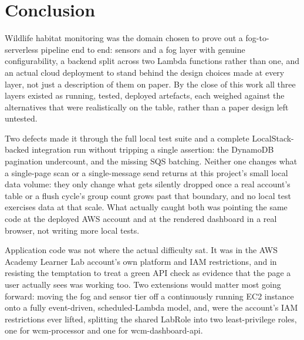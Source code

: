 \documentclass[conference,a4paper]{IEEEtran}
\begin{document}
\section{Conclusion}

Wildlife habitat monitoring was the domain chosen to prove out a fog-to-serverless pipeline end to end: sensors and a fog layer with genuine configurability, a backend split across two Lambda functions rather than one, and an actual cloud deployment to stand behind the design choices made at every layer, not just a description of them on paper. By the close of this work all three layers existed as running, tested, deployed artefacts, each weighed against the alternatives that were realistically on the table, rather than a paper design left untested.

Two defects made it through the full local test suite and a complete LocalStack-backed integration run without tripping a single assertion: the DynamoDB pagination undercount, and the missing SQS batching. Neither one changes what a single-page scan or a single-message send returns at this project's small local data volume: they only change what gets silently dropped once a real account's table or a flush cycle's group count grows past that boundary, and no local test exercises data at that scale. What actually caught both was pointing the same code at the deployed AWS account and at the rendered dashboard in a real browser, not writing more local tests.

Application code was not where the actual difficulty sat. It was in the AWS Academy Learner Lab account's own platform and IAM restrictions, and in resisting the temptation to treat a green API check as evidence that the page a user actually sees was working too. Two extensions would matter most going forward: moving the fog and sensor tier off a continuously running EC2 instance onto a fully event-driven, scheduled-Lambda model, and, were the account's IAM restrictions ever lifted, splitting the shared LabRole into two least-privilege roles, one for wcm-processor and one for wcm-dashboard-api.



\end{document}
